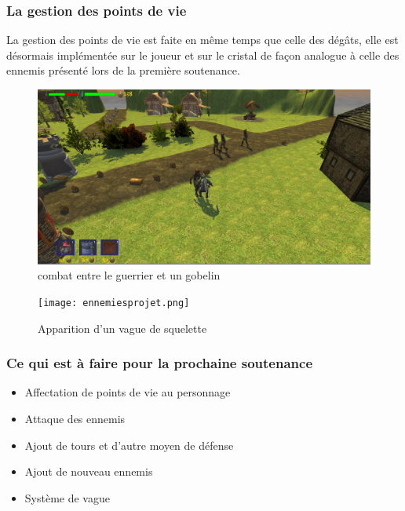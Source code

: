 \documentclass[a4paper, 12pt]{article}
\begin{document}
		\subsubsection{La gestion des points de vie}
La gestion des points de vie est faite en même temps que celle des dégâts, elle est désormais implémentée sur le joueur et sur le cristal de façon analogue à celle des ennemis présenté lors de la première soutenance.
	\begin{figure}[!ht]
		\centerline{\includegraphics[scale=0.3]{fight.png}}
		\caption*{combat entre le guerrier et un gobelin}
	\end{figure}
 
	\begin{figure}[!ht]
		\centerline{\texttt{[image: ennemiesprojet.png]}}
		\caption*{Apparition d'un vague de squelette}
	\end{figure}

	\subsubsection*{Ce qui est à faire pour la prochaine soutenance}	
	\begin{itemize}
	\item Affectation de points de vie au personnage
	\item Attaque des ennemis
	\item Ajout de tours et d'autre moyen de d\'efense
	\item Ajout de nouveau ennemis 
	\item Système de vague
	\end{itemize}
\end{document}
